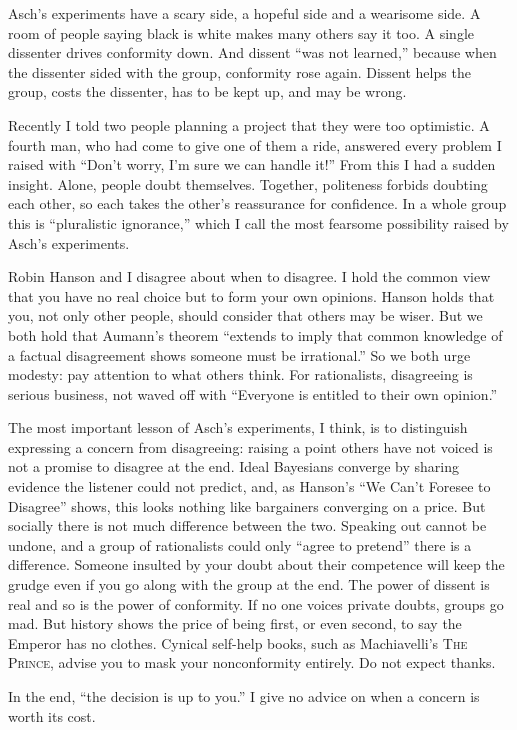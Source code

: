 
Asch's experiments have a scary side, a hopeful side and a wearisome side. A room of people saying black is white makes many others say it too. A single dissenter drives conformity down. And dissent ``was not learned,'' because when the dissenter sided with the group, conformity rose again.  Dissent helps the group, costs the dissenter, has to be kept up, and may be wrong.

Recently I told two people planning a project that they were too optimistic. A fourth man, who had come to give one of them a ride, answered every problem I raised with ``Don't worry, I'm sure we can handle it!'' From this I had a sudden insight. Alone, people doubt themselves. Together, politeness forbids doubting each other, so each takes the other's reassurance for confidence. In a whole group this is ``pluralistic ignorance,'' which I call the most fearsome possibility raised by Asch's experiments.

Robin Hanson and I disagree about when to disagree. I hold the common view that you have no real choice but to form your own opinions. Hanson holds that you, not only other people, should consider that others may be wiser. But we both hold that Aumann's theorem ``extends to imply that common knowledge of a factual disagreement shows someone must be irrational.''  So we both urge modesty: pay attention to what others think. For rationalists, disagreeing is serious business, not waved off with ``Everyone is entitled to their own opinion.''

The most important lesson of Asch's experiments, I think, is to distinguish expressing a concern from disagreeing: raising a point others have not voiced is not a promise to disagree at the end. Ideal Bayesians converge by sharing evidence the listener could not predict, and, as Hanson's ``We Can't Foresee to Disagree'' shows, this looks nothing like bargainers converging on a price. But socially there is not much difference between the two. Speaking out cannot be undone, and a group of rationalists could only ``agree to pretend'' there is a difference. Someone insulted by your doubt about their competence will keep the grudge even if you go along with the group at the end. The power of dissent is real and so is the power of conformity. If no one voices private doubts, groups go mad. But history shows the price of being first, or even second, to say the Emperor has no clothes. Cynical self-help books, such as Machiavelli's \textsc{The Prince}, advise you to mask your nonconformity entirely. Do not expect thanks.

In the end, ``the decision is up to you.'' I give no advice on when a concern is worth its cost.
